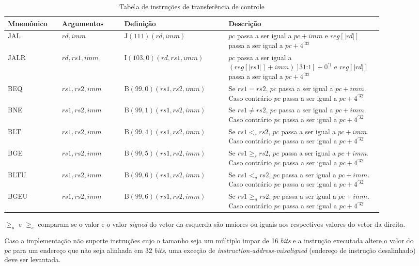   \begin{table}
    \begin{tabular}{ |p{0.13\linewidth}||p{0.15\linewidth}|p{0.25\linewidth}|p{0.37\linewidth}| } 
      \hline
      Mnemônico & Argumentos & Definição & Descrição\\ \hline \hline

JAL & $rd, imm$ & J$(111)(rd, imm)$ & $pc$ passa a ser igual a $pc + imm$ e $reg[|rd|]$ passa a ser igual a $pc + 4^{'32}$\\ \hline
JALR & $rd, rs1, imm$ & I$(103, 0)(rd, rs1, imm)$ & $pc$ passa a ser igual a $(reg[|rs1|] + imm)[31\text{:}1] + 0^{'1}$ e $reg[|rd|]$ passa a ser igual a $pc + 4^{'32}$\\ \hline
BEQ & $rs1, rs2, imm$ & B$(99, 0)(rs1, rs2, imm)$ & Se $rs1 = rs2$, $pc$ passa a ser igual a $pc + imm$. Caso contrário $pc$ passa a ser igual a $pc + 4^{'32}$ \\ \hline
BNE & $rs1, rs2, imm$ & B$(99, 1)(rs1, rs2, imm)$ & Se $rs1 \neq rs2$, $pc$ passa a ser igual a $pc + imm$. Caso contrário $pc$ passa a ser igual a $pc + 4^{'32}$ \\ \hline
BLT & $rs1, rs2, imm$ & B$(99, 4)(rs1, rs2, imm)$ & Se $rs1 <_s rs2$, $pc$ passa a ser igual a $pc + imm$. Caso contrário $pc$ passa a ser igual a $pc + 4^{'32}$ \\ \hline
BGE & $rs1, rs2, imm$ & B$(99, 5)(rs1, rs2, imm)$ & Se $rs1 \geq_s rs2$, $pc$ passa a ser igual a $pc + imm$. Caso contrário $pc$ passa a ser igual a $pc + 4^{'32}$ \\ \hline
BLTU & $rs1, rs2, imm$ & B$(99, 6)(rs1, rs2, imm)$ & Se $rs1 <_u rs2$, $pc$ passa a ser igual a $pc + imm$. Caso contrário $pc$ passa a ser igual a $pc + 4^{'32}$ \\ \hline
BGEU & $rs1, rs2, imm$ & B$(99, 6)(rs1, rs2, imm)$ & Se $rs1 \geq_u rs2$, $pc$ passa a ser igual a $pc + imm$. Caso contrário $pc$ passa a ser igual a $pc + 4^{'32}$ \\ \hline

    \end{tabular}
  \caption{Tabela de instruções de transferência de controle \label{tab:jb32}}
  \end{table}

  $\geq_u$ e $\geq_s$ comparam se o valor e o valor \emph{signed} do vetor da esquerda são maiores ou iguais
  aos respectivos valores do vetor da direita.

  Caso a implementação não suporte instruções cujo o tamanho seja um múltiplo impar de 16 \emph{bits} e a
  instrução executada altere o valor do $pc$ para um endereço que não seja alinhada em 32 \emph{bits}, uma exceção
  de \emph{instruction-address-misaligned} (endereço de instrução desalinhado) deve ser levantada.
  
